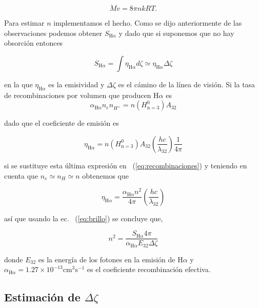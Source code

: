 \documentclass{article}
\newcommand\U[1]{\ensuremath{\mathrm{#1}}}
\newcommand\cm{\U{cm}}
\newcommand\ha{\ensuremath{\mathrm{H}\alpha}}
\begin{document}
\begin{equation}
  \label{eq:perdida-masa}
  \dot{M}v = 8 \pi n kR T. 
\end{equation}

 Para estimar \(n\) implementamos el hecho. Como se dijo anteriormente de las observaciones podemos obtener \(S_{\ha}\) y dado que si suponemos que no hay obsorción entonces 

\begin{equation}
  \label{eq:brillo}
  S_{\ha} = \int \eta_{\ha} d\zeta \simeq \eta_{\ha} \Delta \zeta
\end{equation}

\noindent en la que \(\eta_{\ha}\) es la emisividad y \(\Delta \zeta\) es el cámino de la línea de visión. Si la tasa de recombinaciones por volumen que producen \ha{}  es 
\begin{equation}
  \label{eq:recombinaciones}
  \alpha_{\ha} n_{e}n_{H^{+}}=n(H^0_{\text{n}=3})A_{32}
\end{equation}

\noindent dado que el coeficiente de emisión es

\begin{equation*}
 \eta_{\ha} = n(H^0_{\text{n}=3})A_{32} \left(\frac{hc}{\lambda_{32}}\right) \frac{1}{4\pi}
\end{equation*}

\noindent si se sustituye esta última expresión en ~(\ref{eq:recombinaciones}) y teniendo en cuenta que \(n_{e}\simeq n_{H} \simeq n\) obtenemos que

\begin{equation*}
 \eta_{\ha} =  \frac{\alpha_{\ha}n^{2}}{4\pi} \left(\frac{hc}{\lambda_{32}}\right)  
\end{equation*}

\noindent así que usando la ec. ~(\ref{eq:brillo}) se concluye que,

\begin{equation}
  \label{eq:densidad}
  n^{2}=\frac{S_{\ha} 4 \pi}{\alpha_{\ha} E_{32} \Delta \zeta}
\end{equation}

\noindent donde \( E_{32}\) es la energía de los fotones en la emisión de \ha{}  y \(\alpha_{\ha}=1.27\times 10^{-13}\cm^{3} \text{s}^{-1} \) es el coeficiente recombinación efectiva.\\

\subsection{Estimación de \(\Delta \zeta\)}
\label{sec:delta}
\end{document}
